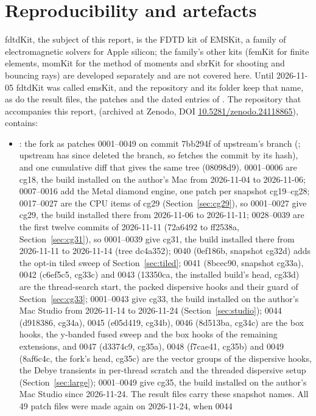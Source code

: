 \section{Reproducibility and artefacts}\label{sec:repro}
fdtdKit, the subject of this report, is the FDTD kit of EMSKit, a family of electromagnetic solvers for Apple
silicon; the family's other kits (femKit for finite elements, momKit for the method of moments and sbrKit for shooting
and bouncing rays) are developed separately and are not covered here. Until 2026-11-05 fdtdKit was called emsKit, and
the repository and its folder keep that name, as do the result files, the patches and the dated entries of
.
The repository that accompanies this report, \repourl{} (archived at Zenodo, DOI
\href{https://doi.org/10.5281/zenodo.24118865}{10.5281/zenodo.24118865}), contains:
\begin{itemize}
\item {}: the fork as  patches 0001--0049 on commit 7bb294f of upstream's
   branch (; upstream has since deleted the branch, so
   fetches the commit by its hash), and one cumulative diff that gives the same tree (08098d9).
  0001--0006 are
  cg18, the build installed on the author's Mac from 2026-11-04 to 2026-11-06; 0007--0016 add the Metal diamond
  engine, one patch per snapshot cg19--cg28; 0017--0027 are the CPU items of cg29 (Section~\ref{sec:cg29}), so
  0001--0027 give cg29, the build installed there from 2026-11-06 to 2026-11-11; 0028--0039 are the first twelve
  commits of 2026-11-11 (72a6492 to ff2538a, Section~\ref{sec:cg31}), so 0001--0039 give cg31, the build installed there
  from 2026-11-11 to 2026-11-14 (tree dc4a352); 0040 (0ef186b, snapshot cg32d) adds the opt-in tiled sweep of
  Section~\ref{sec:tiled}; 0041 (8bcec90, snapshot cg33a), 0042 (c6ef5c5, cg33c) and 0043 (13350ca, the installed build's head,
  cg33d) are the thread-search start, the packed dispersive hooks and their guard of Section~\ref{sec:cg33}; 0001--0043 give
  cg33, the build installed on the author's Mac Studio from 2026-11-14 to 2026-11-24 (Section~\ref{sec:studio}); 0044 (d918386, cg34a), 0045 (e05d419, cg34b), 0046 (8d513ba, cg34c) are the box hooks, the y-banded fused sweep and the box hooks of the remaining extensions, and 0047 (d3374c9, cg35a), 0048 (f7cae41, cg35b) and 0049 (8af6c4c, the fork's head, cg35c) are the vector groups of the dispersive hooks, the Debye transients in per-thread scratch and the threaded dispersive setup (Section~\ref{sec:large}); 0001--0049 give cg35, the build installed on the author's Mac Studio since 2026-11-24. The result files carry these snapshot names. All 49 patch files were made again on 2026-11-24, when 0044

\end{itemize}
